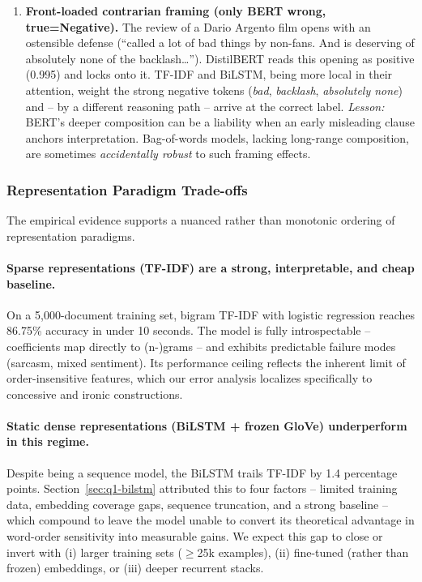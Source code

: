 \documentclass[11pt,a4paper]{article}
\begin{document}
\begin{enumerate}[leftmargin=*]
    \item \textbf{Front-loaded contrarian framing (only BERT wrong, true=Negative).} The review of a Dario Argento film opens with an ostensible defense (``called a lot of bad things by non-fans. And is deserving of absolutely none of the backlash\ldots''). DistilBERT reads this opening as positive (0.995) and locks onto it. TF-IDF and BiLSTM, being more local in their attention, weight the strong negative tokens (\emph{bad}, \emph{backlash}, \emph{absolutely none}) and -- by a different reasoning path -- arrive at the correct label. \emph{Lesson:} BERT's deeper composition can be a liability when an early misleading clause anchors interpretation. Bag-of-words models, lacking long-range composition, are sometimes \emph{accidentally robust} to such framing effects.
\end{enumerate}

\subsubsection{Representation Paradigm Trade-offs}

The empirical evidence supports a nuanced rather than monotonic ordering of representation paradigms.

\paragraph{Sparse representations (TF-IDF) are a strong, interpretable, and cheap baseline.} On a 5{,}000-document training set, bigram TF-IDF with logistic regression reaches 86.75\% accuracy in under 10 seconds. The model is fully introspectable -- coefficients map directly to (n-)grams -- and exhibits predictable failure modes (sarcasm, mixed sentiment). Its performance ceiling reflects the inherent limit of order-insensitive features, which our error analysis localizes specifically to concessive and ironic constructions.

\paragraph{Static dense representations (BiLSTM + frozen GloVe) underperform in this regime.} Despite being a sequence model, the BiLSTM trails TF-IDF by 1.4 percentage points. Section~\ref{sec:q1-bilstm} attributed this to four factors -- limited training data, embedding coverage gaps, sequence truncation, and a strong baseline -- which compound to leave the model unable to convert its theoretical advantage in word-order sensitivity into measurable gains. We expect this gap to close or invert with (i) larger training sets ($\geq$25k examples), (ii) fine-tuned (rather than frozen) embeddings, or (iii) deeper recurrent stacks.
\end{document}
